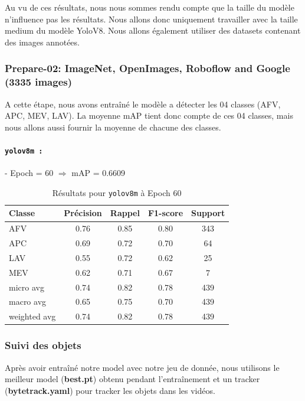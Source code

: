 Au vu de ces résultats, nous nous sommes rendu compte que la taille du modèle n'influence pas les résultats. Nous allons donc uniquement travailler avec la taille medium du modèle YoloV8.
Nous allons également utiliser des datasets contenant des images annotées.


\subsubsection*{Prepare-02: ImageNet, OpenImages, Roboflow and Google  (3335 images)}

A cette étape, nous avons entraîné le modèle a détecter les 04 classes (AFV, APC, MEV, LAV).
La moyenne mAP tient donc compte de ces 04 classes, mais nous allons aussi fournir la moyenne de chacune des classes.

\paragraph{\texttt{yolov8m :}}
- Epoch = 60 $\Rightarrow$ mAP = 0.6609
\begin{table}[h!]
	\centering
	\begin{tabular}{|l|c|c|c|c|}
		\hline
		Classe       & Précision & Rappel & F1-score & Support \\ \hline
		AFV          & 0.76      & 0.85   & 0.80     & 343     \\ \hline
		APC          & 0.69      & 0.72   & 0.70     & 64      \\ \hline
		LAV          & 0.55      & 0.72   & 0.62     & 25      \\ \hline
		MEV          & 0.62      & 0.71   & 0.67     & 7       \\ \hline
		micro avg    & 0.74      & 0.82   & 0.78     & 439     \\ \hline
		macro avg    & 0.65      & 0.75   & 0.70     & 439     \\ \hline
		weighted avg & 0.74      & 0.82   & 0.78     & 439     \\ \hline
	\end{tabular}
	\caption{Résultats pour \texttt{yolov8m} à Epoch 60}
	\label{tab:yolov8m_epoch60}
\end{table}




\subsubsection{Suivi des objets}

Après avoir entraîné notre model avec notre jeu de donnée, nous utilisons le meilleur model (\textbf{best.pt}) obtenu pendant l'entraînement et un tracker (\textbf{bytetrack.yaml}) pour tracker les objets dans les vidéos.


